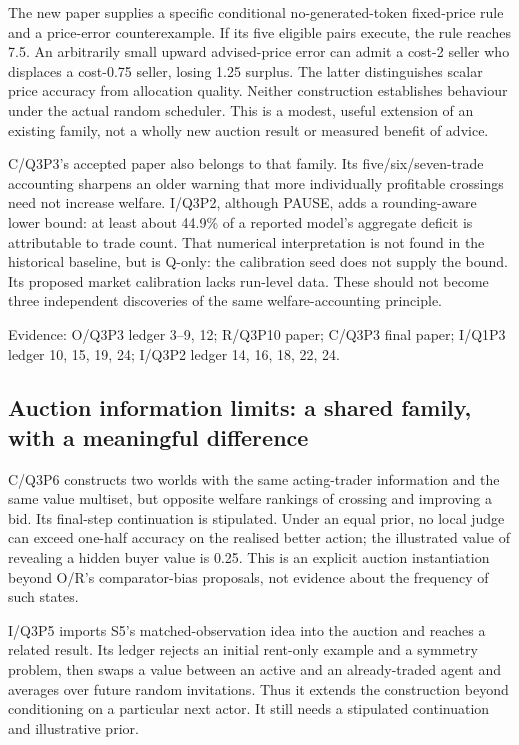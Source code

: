 \documentclass[11pt,a4paper]{article}
\newcommand{\ev}[1]{{\small\textsf{Evidence:} #1}}
\begin{document}
The new paper supplies a specific conditional no-generated-token fixed-price
rule and a price-error counterexample. If its five eligible pairs execute,
the rule reaches 7.5. An arbitrarily small upward advised-price error can
admit a cost-2 seller who displaces a cost-0.75 seller, losing 1.25 surplus.
The latter distinguishes scalar price accuracy from allocation quality.
Neither construction establishes behaviour under the actual random scheduler.
This is a modest, useful extension of an existing family, not a wholly new
auction result or measured benefit of advice.

C/Q3P3's accepted paper also belongs to that family. Its five/six/seven-trade
accounting sharpens an older warning that more individually profitable
crossings need not increase welfare. I/Q3P2, although PAUSE, adds a
rounding-aware lower bound: at least about 44.9\% of a reported model's
aggregate deficit is attributable to trade count. That numerical
interpretation is not found in the historical baseline, but is Q-only:
the calibration seed does not supply the bound. Its proposed market
calibration lacks run-level data. These should not become three independent
discoveries of the same welfare-accounting principle.

\ev{O/Q3P3 ledger 3--9, 12; R/Q3P10 paper;
C/Q3P3 final paper; I/Q1P3 ledger 10, 15, 19, 24;
I/Q3P2 ledger 14, 16, 18, 22, 24.}

\subsection{Auction information limits: a shared family, with a meaningful difference}

C/Q3P6 constructs two worlds with the same acting-trader information and
the same value multiset, but opposite welfare rankings of crossing and
improving a bid. Its final-step continuation is stipulated. Under an equal
prior, no local judge can exceed one-half accuracy on the realised better
action; the illustrated value of revealing a hidden buyer value is 0.25.
This is an explicit auction instantiation beyond O/R's comparator-bias
proposals, not evidence about the frequency of such states.

I/Q3P5 imports S5's matched-observation idea into the auction and reaches a
related result. Its ledger rejects an initial rent-only example and a
symmetry problem, then swaps a value between an active and an already-traded
agent and averages over future random invitations. Thus it extends the
construction beyond conditioning on a particular next actor. It still needs
a stipulated continuation and illustrative prior.
\end{document}
